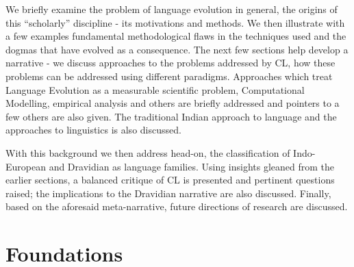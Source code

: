 We briefly examine the problem of language evolution in general, the origins of this “scholarly” discipline - its motivations and methods. We then illustrate with a few examples fundamental methodological flaws in the techniques used and the dogmas that have evolved as a consequence. The next few sections help develop a narrative - we discuss approaches to the problems addressed by CL, how these problems can be addressed using different paradigms. Approaches which treat Language Evolution as a measurable scientific problem, Computational Modelling, empirical analysis and others are briefly addressed and pointers to a few others are also given. The traditional Indian approach to language and the approaches to linguistics is also discussed.

With this background we then address head-on, the classification of Indo-European and Dravidian as language families. Using insights gleaned from the earlier sections, a balanced critique of CL is presented and pertinent questions raised; the implications to the Dravidian narrative are also discussed. Finally, based on the aforesaid meta-narrative, future directions of research are discussed.


\section*{Foundations}

